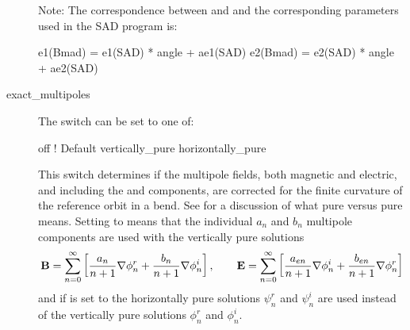 \begin{description}
Note: The correspondence between  and  and the corresponding parameters used in the
SAD program \cite{b:sad} is:
\begin{example}
  e1(Bmad) =  e1(SAD) * angle + ae1(SAD)
  e2(Bmad) =  e2(SAD) * angle + ae2(SAD)
\end{example}
  \item[exact_multipoles] \Newline
The  switch can be set to one of:
\begin{example}
  off                 ! Default
  vertically_pure    
  horizontally_pure  
\end{example}
This switch determines if the multipole fields, both magnetic and electric, and including the
 and  components, are corrected for the finite curvature of the reference orbit in a
bend. See  for a discussion of what  pure versus
 pure means. Setting  to  means that the
individual $a_n$ and $b_n$ multipole components are used with the vertically pure solutions
\begin{equation}
  {\bf B} = \sum_{n = 0}^\infty \left[ \frac{a_n}{n+1} \nabla \phi_n^r + \frac{b_n}{n+1} \nabla \phi_n^i \right], \qquad
  {\bf E} = \sum_{n = 0}^\infty \left[ \frac{a_{en}}{n+1} \nabla \phi_n^i + \frac{b_{en}}{n+1} \nabla \phi_n^r \right]
\end{equation}
and if  is set to  the horizontally pure solutions
$\psi_n^r$ and $\psi_n^i$ are used instead of the vertically pure solutions $\phi_n^r$ and
$\phi_n^i$.


\end{description}
